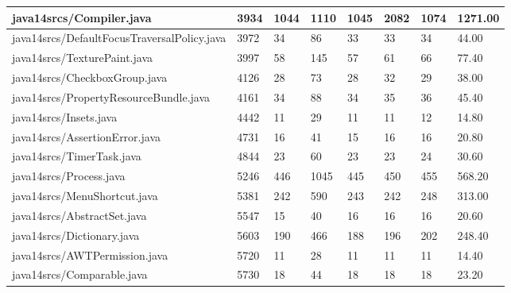 \begin{tabular}{|l|l|l|l|l|l|l|l|}
\hline
java14srcs/Compiler.java                           & 3934        & 1044      & 1110      & 1045      & 2082      & 1074      & 1271.00   \\
\hline
java14srcs/DefaultFocusTraversalPolicy.java        & 3972        & 34        & 86        & 33        & 33        & 34        & 44.00     \\
\hline
java14srcs/TexturePaint.java                       & 3997        & 58        & 145       & 57        & 61        & 66        & 77.40     \\
\hline
java14srcs/CheckboxGroup.java                      & 4126        & 28        & 73        & 28        & 32        & 29        & 38.00     \\
\hline
java14srcs/PropertyResourceBundle.java             & 4161        & 34        & 88        & 34        & 35        & 36        & 45.40     \\
\hline
java14srcs/Insets.java                             & 4442        & 11        & 29        & 11        & 11        & 12        & 14.80     \\
\hline
java14srcs/AssertionError.java                     & 4731        & 16        & 41        & 15        & 16        & 16        & 20.80     \\
\hline
java14srcs/TimerTask.java                          & 4844        & 23        & 60        & 23        & 23        & 24        & 30.60     \\
\hline
java14srcs/Process.java                            & 5246        & 446       & 1045      & 445       & 450       & 455       & 568.20    \\
\hline
java14srcs/MenuShortcut.java                       & 5381        & 242       & 590       & 243       & 242       & 248       & 313.00    \\
\hline
java14srcs/AbstractSet.java                        & 5547        & 15        & 40        & 16        & 16        & 16        & 20.60     \\
\hline
java14srcs/Dictionary.java                         & 5603        & 190       & 466       & 188       & 196       & 202       & 248.40    \\
\hline
java14srcs/AWTPermission.java                      & 5720        & 11        & 28        & 11        & 11        & 11        & 14.40     \\
\hline
java14srcs/Comparable.java                         & 5730        & 18        & 44        & 18        & 18        & 18        & 23.20     \\

\end{tabular}
